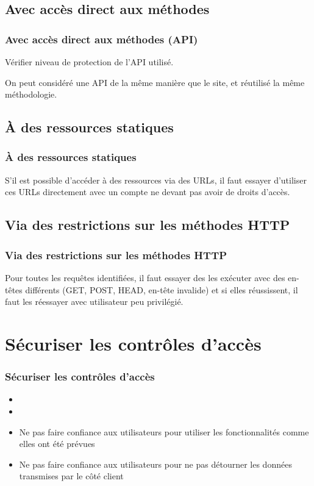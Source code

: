 \documentclass{beamer}
\begin{document}
\subsection{Avec accès direct aux méthodes}
\begin{frame}
  \frametitle{Avec accès direct aux méthodes (API)}
  Vérifier niveau de protection de l'API utilisé.
  
  On peut considéré une API de la même manière que le site, et réutilisé la même méthodologie.
\end{frame}

\subsection{À des ressources statiques}
\begin{frame}
  \frametitle{À des ressources statiques}
  S'il est possible d'accéder à des ressources via des URLs, il faut essayer d'utiliser ces URLs directement avec un compte ne devant pas avoir de droits d'accès.
\end{frame}

\subsection{Via des restrictions sur les méthodes HTTP}
\begin{frame}
  \frametitle{Via des restrictions sur les méthodes HTTP}
  Pour toutes les requêtes identifiées, il faut essayer des les exécuter avec des en-têtes différents (GET, POST, HEAD, en-tête invalide) et si elles réussissent, il faut les réessayer avec utilisateur peu privilégié. 
\end{frame}


\section{Sécuriser les contrôles d'accès}
\begin{frame}
  \frametitle{Sécuriser les contrôles d'accès}
  \begin{itemize}
    \item 
    \item 
    \item Ne pas faire confiance aux utilisateurs pour utiliser les fonctionnalités comme elles ont été prévues
    \item Ne pas faire confiance aux utilisateurs pour ne pas détourner les données transmises par le côté client
  \end{itemize}
\end{frame}
\end{document}
